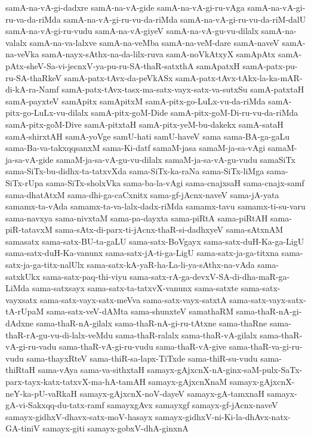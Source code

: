 {samA-na-vA-gi-dadxre
samA-na-vA-gide
samA-na-vA-gi-ru-vAga
samA-na-vA-gi-ru-va-da-riMda
samA-na-vA-gi-ru-vu-da-riMda
samA-na-vA-gi-ru-vu-da-riM-dalU
samA-na-vA-gi-ru-vudu
samA-na-vA-giyeV
samA-na-vA-gu-vu-dilalx
samA-na-valalx
samA-na-va-lalxve
samA-na-veMba
samA-na-veM-dare
samA-naveV
samA-na-veVka
samA-nayx-sAthx-na-da-lilx-ruva
samA-noVkAtxyX
samApAtx
samA-pAtx-sheV-Sa-vi-jecnxV-ya-pu-ru-SA-thaR-satxthA
samApatxH
samA-patx-pu-ru-SA-thaRkeV
samA-patx-tAvx-da-peVkASx
samA-patx-tAvx-tAkx-la-ka-mAR-di-kA-ra-Namf
samA-patx-tAvx-tasx-ma-satx-vayx-satx-va-sutxSu
samA-patxtaH
samA-payxteV
samApitx
samApitxM
samA-pitx-go-LuLx-vu-da-riMda
samA-pitx-go-LuLx-vu-dilalx
samA-pitx-goM-Dide
samA-pitx-goM-Di-ru-vu-da-riMda
samA-pitx-goM-Dive
samA-pitxtaH
samA-pitx-yeM-bu-dakekx
samA-sataH
samA-shirxtAH
samA-yoVge
samU-hati
samU-haveV
sama
sama-BA-ga-gaLu
sama-Ba-va-takxqqsanxM
sama-Ki-datf
samaM-jasa
samaM-ja-sa-vAgi
samaM-ja-sa-vA-gide
samaM-ja-sa-vA-gu-vu-dilalx
samaM-ja-sa-vA-gu-vudu
samaSiTx
sama-SiTx-bu-didhx-ta-tatxvXda
sama-SiTx-ka-raNa
sama-SiTx-liMga
sama-SiTx-rUpa
sama-SiTx-sholxVka
sama-ba-la-vAgi
sama-cnajxsaH
sama-cnajx-samf
sama-dhatAtxM
sama-dhi-ga-caCxnitx
sama-gf-jAcnx-naveV
sama-jA-yata
samamx-ta-vAda
samamx-ta-va-lalx-dadx-riMda
samamx-tavu
samamx-ti-su-varu
sama-navxya
sama-nivxtaM
sama-pa-dayxta
sama-piRtA
sama-piRtAH
sama-piR-tatavxM
sama-sAtx-di-parx-ti-jAcnx-thaR-si-dadhxyeV
sama-sAtxnAM
samasatx
sama-satx-BU-ta-gaLU
sama-satx-BoVgayx
sama-satx-duH-Ka-ga-LigU
sama-satx-duH-Ka-vanunx
sama-satx-jA-ti-ga-LigU
sama-satx-ja-ga-titxna
sama-satx-ja-ga-titx-nalUlx
sama-satx-kA-yaR-ha-La-li-ya-sAthx-na-vAda
sama-satxkUkx
sama-satx-paq-thi-viyu
sama-satx-rA-ga-devxV-SA-di-dha-maR-ga-LiMda
sama-satxsayx
sama-satx-ta-tatxvX-vanunx
sama-satxte
sama-satx-vayxsatx
sama-satx-vayx-satx-meVva
sama-satx-vayx-satxtA
sama-satx-vayx-satx-tA-rUpaM
sama-satx-veV-dAMta
sama-shunxteV
samathaRM
sama-thaR-nA-gi-dAdxne
sama-thaR-nA-gilalx
sama-thaR-nA-gi-ru-tAtxne
sama-thaRne
sama-thaR-rA-gu-vu-di-lalx-veMdu
sama-thaR-ralalx
sama-thaR-vA-gilalx
sama-thaR-vA-gi-ru-vadu
sama-thaR-vA-gi-ru-vudu
sama-thaR-vA-give
sama-thaR-va-gi-ru-vudu
sama-thayxRteV
sama-thiR-sa-lapx-TiTxde
sama-thiR-su-vudu
sama-thiRtaH
sama-vAya
sama-va-sithxtaH
samayx-gAjxcnX-nA-ginx-saM-pulx-SaTx-parx-tayx-katx-tatxvX-ma-hA-tamAH
samayx-gAjxcnXnaM
samayx-gAjxcnX-neY-ka-pU-vaRkaH
samayx-gAjxcnX-noV-dayeV
samayx-gA-tamxnaH
samayx-gA-vi-Sakxqq-du-tatx-ramf
samayxgAvx
samayxgf
samayx-gf-jAcnx-naveV
samayx-gidhxV-dhavx-satx-moV-hasayx
samayx-gidhxV-ni-Ki-la-dhAvx-natx-GA-tiniV
samayx-giti
samayx-gobxV-dhA-ginxnA
}
